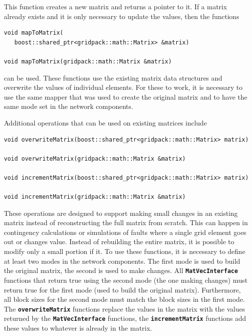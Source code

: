 \documentclass[12pt]{report} %
\begin{document}
This function creates a new matrix and returns a pointer to it. If a matrix already exists and it is only necessary to update the values, then the functions

{
\color{red}
\begin{Verbatim}[fontseries=b]
void mapToMatrix(
   boost::shared_ptr<gridpack::math::Matrix> &matrix)

void mapToMatrix(gridpack::math::Matrix &matrix)
\end{Verbatim}
}

can be used. These functions use the existing matrix data structures and overwrite the values of individual elements. For these to work, it is necessary to use the same mapper that was used to create the original matrix and to have the same mode set in the network components.

Additional operations that can be used on existing matrices include

{
\color{red}
\begin{Verbatim}[fontseries=b]
void overwriteMatrix(boost::shared_ptr<gridpack::math::Matrix> matrix)

void overwriteMatrix(gridpack::math::Matrix &matrix)

void incrementMatrix(boost::shared_ptr<gridpack::math::Matrix> matrix)

void incrementMatrix(gridpack::math::Matrix &matrix)
\end{Verbatim}
}

These operations are designed to support making small changes in an existing matrix instead of reconstructing the full matrix from scratch. This can happen in contingency calculations or simulations of faults where a single grid element goes out or changes value. Instead of rebuilding the entire matrix, it is possible to modify only a small portion if it. To use these functions, it is necessary to define at least two modes in the network components. The first mode is used to build the original matrix, the second is used to make changes. All \texttt{\textbf{MatVecInterface}} functions that return true using the second mode (the one making changes) must return true for the first mode (used to build the original matrix). Furthermore, all block sizes for the second mode must match the block sizes in the first mode. The \texttt{\textbf{overwriteMatrix}} functions replace the values in the matrix with the values returned by the \texttt{\textbf{MatVecInterface}} functions, the \texttt{\textbf{incrementMatrix}} functions add these values to whatever is already in the matrix.
\end{document}
